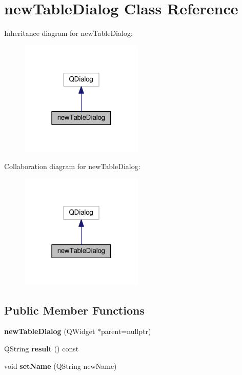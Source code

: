 \hypertarget{classnewTableDialog}{}\section{new\+Table\+Dialog Class Reference}
\label{classnewTableDialog}


Inheritance diagram for new\+Table\+Dialog\+:\nopagebreak
\begin{figure}[H]
\begin{center}
\leavevmode
\includegraphics[width=166pt]{classnewTableDialog__inherit__graph}
\end{center}
\end{figure}


Collaboration diagram for new\+Table\+Dialog\+:\nopagebreak
\begin{figure}[H]
\begin{center}
\leavevmode
\includegraphics[width=166pt]{classnewTableDialog__coll__graph}
\end{center}
\end{figure}
\subsection*{Public Member Functions}
\begin{DoxyCompactItemize}
\item 
{\bfseries new\+Table\+Dialog} (Q\+Widget $\ast$parent=nullptr)\hypertarget{classnewTableDialog_a7a25df73a8ea0e006f792b8b43eac977}{}\label{classnewTableDialog_a7a25df73a8ea0e006f792b8b43eac977}

\item 
Q\+String {\bfseries result} () const \hypertarget{classnewTableDialog_ac0de03f51c710bf1cf145eed430960fd}{}\label{classnewTableDialog_ac0de03f51c710bf1cf145eed430960fd}

\item 
void {\bfseries set\+Name} (Q\+String new\+Name)\hypertarget{classnewTableDialog_a2fc35c47ae2fb5d3676e0107214b1f26}{}\label{classnewTableDialog_a2fc35c47ae2fb5d3676e0107214b1f26}

\end{DoxyCompactItemize}


